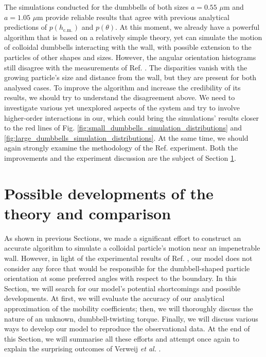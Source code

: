 \documentclass{master_thesis}
\begin{document}
The simulations conducted for the dumbbells of both sizes $a=0.55$ $\mu$m and $a=1.05$ $\mu$m provide reliable results that agree with previous analytical predictions of $p(h_{\textrm{c.m.}})$ and $p(\theta)$. At this moment, we already have a powerful algorithm that is based on a relatively simple theory, yet can simulate the motion of colloidal dumbbells interacting with the wall, with possible extension to the particles of other shapes and sizes. However, the angular orientation histograms still disagree with the measurements of Ref. \cite{verweij2021}. The disparities vanish with the growing particle's size and distance from the wall, but they are present for both analysed cases. To improve the algorithm and increase the credibility of its results, we should try to understand the disagreement above. We need to investigate various yet unexplored aspects of the system and try to involve higher-order interactions in our, which could bring the simulations' results closer to the red lines of Fig. \ref{fig:small_dumbbells_simulation_distributions} and \ref{fig:large_dumbbells_simulation_distributions}. At the same time, we should again strongly examine the methodology of the Ref. \cite{verweij2021} experiment. Both the improvements and the experiment discussion are the subject of Section \ref{sec:developments_results}.


\section{Possible developments of the theory and comparison} \label{sec:developments_results}

As shown in previous Sections, we made a significant effort to construct an accurate algorithm to simulate a colloidal particle's motion near an impenetrable wall. However, in light of the experimental results of Ref. \cite{verweij2021}, our model does not consider any force that would be responsible for the dumbbell-shaped particle orientation at some preferred angles with respect to the boundary. In this Section, we will search for our model's potential shortcomings and possible developments. At first, we will evaluate the accuracy of our analytical approximation of the mobility coefficients; then, we will thoroughly discuss the nature of an unknown, dumbbell-twisting torque. Finally, we will discuss various ways to develop our model to reproduce the observational data. At the end of this Section, we will summarise all these efforts and attempt once again to explain the surprising outcomes of Verweij \textit {et al.} \cite{verweij2021}.
\end{document}
